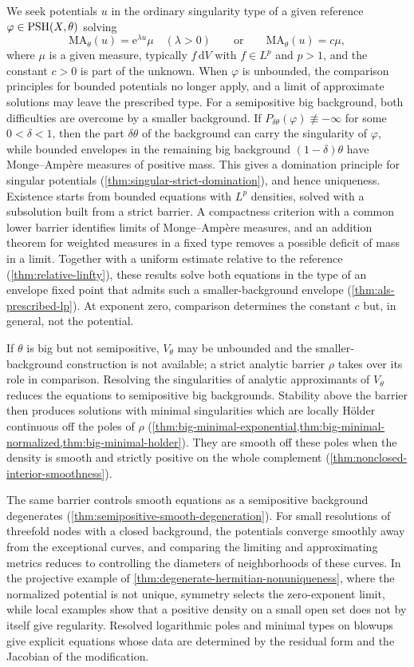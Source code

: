 We seek potentials $u$ in the ordinary singularity type of a given reference $\varphi\in\mathrm{PSH}(X,\theta)$ solving
\[
 \mathrm{MA}_\theta(u)=\mathrm{e}^{\lambda u}\mu\quad(\lambda>0)
 \qquad\text{or}\qquad
 \mathrm{MA}_\theta(u)=c\mu,
\]
where $\mu$ is a given measure, typically $f\,\mathrm{d}V$ with $f\in L^p$ and $p>1$, and the constant $c>0$ is part of the unknown. When $\varphi$ is unbounded, the comparison principles for bounded potentials no longer apply, and a limit of approximate solutions may leave the prescribed type. For a semipositive big background, both difficulties are overcome by a smaller background. If $P_{\delta\theta}(\varphi)\not\equiv-\infty$ for some $0<\delta<1$, then the part $\delta\theta$ of the background can carry the singularity of $\varphi$, while bounded envelopes in the remaining big background $(1-\delta)\theta$ have Monge--Amp\`ere measures of positive mass. This gives a domination principle for singular potentials (\cref{thm:singular-strict-domination}), and hence uniqueness. Existence starts from bounded equations with $L^p$ densities, solved with a subsolution built from a strict barrier. A compactness criterion with a common lower barrier identifies limits of Monge--Amp\`ere measures, and an addition theorem for weighted measures in a fixed type removes a possible deficit of mass in a limit. Together with a uniform estimate relative to the reference (\cref{thm:relative-linfty}), these results solve both equations in the type of an envelope fixed point that admits such a smaller-background envelope (\cref{thm:als-prescribed-lp}). At exponent zero, comparison determines the constant $c$ but, in general, not the potential.

If $\theta$ is big but not semipositive, $V_\theta$ may be unbounded and the smaller-background construction is not available; a strict analytic barrier $\rho$ takes over its role in comparison. Resolving the singularities of analytic approximants of $V_\theta$ reduces the equations to semipositive big backgrounds. Stability above the barrier then produces solutions with minimal singularities which are locally H\"older continuous off the poles of $\rho$ (\cref{thm:big-minimal-exponential,thm:big-minimal-normalized,thm:big-minimal-holder}). They are smooth off these poles when the density is smooth and strictly positive on the whole complement (\cref{thm:nonclosed-interior-smoothness}).

The same barrier controls smooth equations as a semipositive background degenerates (\cref{thm:semipositive-smooth-degeneration}). For small resolutions of threefold nodes with a closed background, the potentials converge smoothly away from the exceptional curves, and comparing the limiting and approximating metrics reduces to controlling the diameters of neighborhoods of these curves. In the projective example of \cref{thm:degenerate-hermitian-nonuniqueness}, where the normalized potential is not unique, symmetry selects the zero-exponent limit, while local examples show that a positive density on a small open set does not by itself give regularity. Resolved logarithmic poles and minimal types on blowups give explicit equations whose data are determined by the residual form and the Jacobian of the modification.

